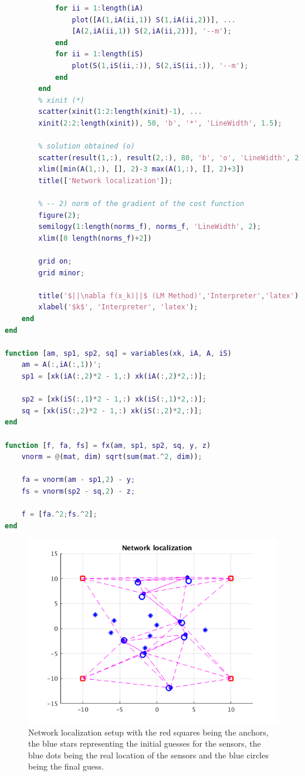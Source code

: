 \begin{lstlisting}[language=Matlab, caption=Matlab code for task 8., label=listing:task8:lm]
            % pink lines
            for ii = 1:length(iA)
                plot([A(1,iA(ii,1)) S(1,iA(ii,2))], ...
                [A(2,iA(ii,1)) S(2,iA(ii,2))], '--m');
            end
            for ii = 1:length(iS)
                plot(S(1,iS(ii,:)), S(2,iS(ii,:)), '--m');
            end
        end
        % xinit (*)
        scatter(xinit(1:2:length(xinit)-1), ...
        xinit(2:2:length(xinit)), 50, 'b', '*', 'LineWidth', 1.5);

        % solution obtained (o)
        scatter(result(1,:), result(2,:), 80, 'b', 'o', 'LineWidth', 2);
        xlim([min(A(1,:), [], 2)-3 max(A(1,:), [], 2)+3])
        title(['Network localization']);
        
        % -- 2) norm of the gradient of the cost function
        figure(2);
        semilogy(1:length(norms_f), norms_f, 'LineWidth', 2);
        xlim([0 length(norms_f)+2])

        grid on;
        grid minor;

        title('$||\nabla f(x_k)||$ (LM Method)','Interpreter','latex')
        xlabel('$k$', 'Interpreter', 'latex');
    end
end

function [am, sp1, sp2, sq] = variables(xk, iA, A, iS)
    am = A(:,iA(:,1))';    
    sp1 = [xk(iA(:,2)*2 - 1,:) xk(iA(:,2)*2,:)];

    sp2 = [xk(iS(:,1)*2 - 1,:) xk(iS(:,1)*2,:)];    
    sq = [xk(iS(:,2)*2 - 1,:) xk(iS(:,2)*2,:)];
end

function [f, fa, fs] = fx(am, sp1, sp2, sq, y, z)
    vnorm = @(mat, dim) sqrt(sum(mat.^2, dim));

    fa = vnorm(am - sp1,2) - y;
    fs = vnorm(sp2 - sq,2) - z;

    f = [fa.^2;fs.^2];
end
\end{lstlisting}

\begin{figure}[H]
    \centering    
    \includegraphics[width=0.5\linewidth]{part2/figures/task8_netloc.png}
    \caption{Network localization setup with the red squares being the anchors, the blue stars representing the initial guesses for the sensors, the blue dots being the real location of the sensors and the blue circles being the final guess.}
    \label{fig:task8:netloc}
\end{figure}

